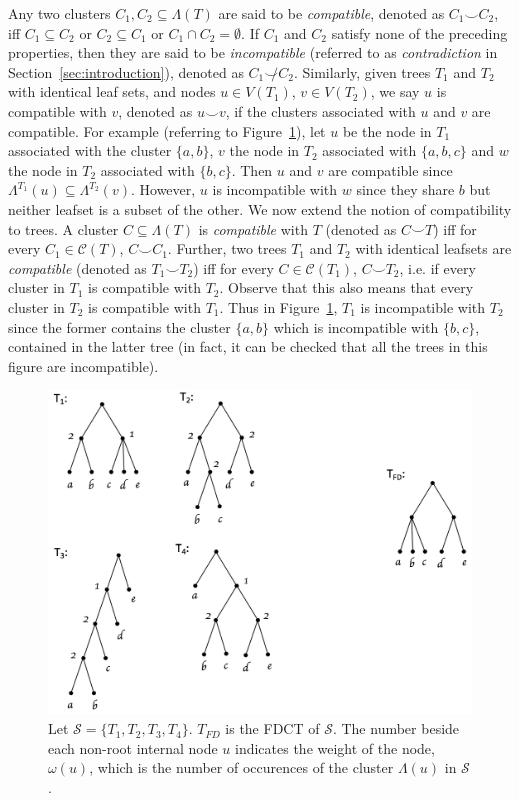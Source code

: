 \documentclass{article}
\newcommand{\compatible}{\smile}
\newcommand{\leafset}{\Lambda}
\newcommand{\weight}{\omega}
\begin{document}
    Any two clusters $C_1, C_2 \subseteq \leafset(T)$ are said to be \textit{compatible}, denoted as $C_1 \compatible C_2$, iff $C_1 \subseteq C_2$ or $C_2 \subseteq C_1$ or $C_1 \cap C_2 = \emptyset$. If $C_1$ and $C_2$ satisfy none of the preceding properties, then they are said to be \textit{incompatible} (referred to as \textit{contradiction} in Section~\ref{sec:introduction}), denoted as $C_1 \not\compatible C_2$. Similarly, given trees $T_1$ and $T_2$ with identical leaf sets, and nodes $u \in V(T_1)$, $v \in V(T_2)$, we say $u$ is compatible with $v$, denoted as $u \compatible v$, if the clusters associated with $u$ and $v$ are compatible. For example (referring to Figure~\ref{fig:freqdiff}), let $u$ be the node in $T_1$ associated with the cluster $\{a, b\}$, $v$ the node in $T_2$ associated with $\{a, b, c\}$ and $w$ the node in $T_2$ associated with $\{b, c\}$. Then $u$ and $v$ are compatible since $\leafset^{T_1}(u) \subseteq \leafset^{T_2}(v)$. However, $u$ is incompatible with $w$ since they share $b$ but neither leafset is a subset of the other. We now extend the notion of compatibility to trees. A cluster $C \subseteq \leafset(T)$ is \textit{compatible} with $T$ (denoted as $C \compatible T$) iff for every $C_1 \in \mathcal{C}(T)$, $C \compatible C_1$. Further, two trees $T_1$ and $T_2$ with identical leafsets are \textit{compatible} (denoted as $T_1 \compatible T_2$) iff for every $C \in \mathcal{C}(T_1)$, $C \compatible T_2$, i.e. if every cluster in $T_1$ is compatible with $T_2$. Observe that this also means that every cluster in $T_2$ is compatible with $T_1$. Thus in Figure~\ref{fig:freqdiff}, $T_1$ is incompatible with $T_2$ since the former contains the cluster $\{a, b\}$ which is incompatible with $\{b, c\}$, contained in the latter tree (in fact, it can be checked that all the trees in this figure are incompatible).

    \begin{figure}[h]
        \includegraphics[scale=0.5]{freqdiff}
        \centering
        \caption{Let $\mathcal{S} = \{T_1, T_2, T_3, T_4\}$. $T_{FD}$ is the FDCT of $\mathcal{S}$. The number beside each non-root internal node $u$ indicates the weight of the node, $\weight(u)$, which is the number of occurences of the cluster $\leafset(u)$ in $\mathcal{S}$.}
        \label{fig:freqdiff}
    \end{figure}
\end{document}
